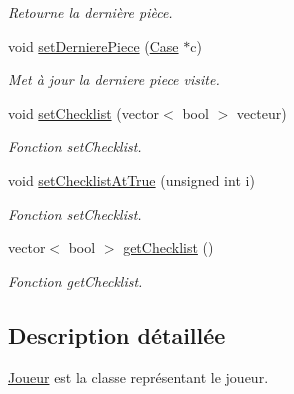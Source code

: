 \begin{DoxyCompactItemize}
\begin{DoxyCompactList}\small\item\em \-Retourne la dernière pièce. \end{DoxyCompactList}\item 
\hypertarget{classJoueur_ace4248a785b7be8e12bcaaf84e3a41b5}{void \hyperlink{classJoueur_ace4248a785b7be8e12bcaaf84e3a41b5}{set\-Derniere\-Piece} (\hyperlink{classCase}{\-Case} $\ast$c)}\label{classJoueur_ace4248a785b7be8e12bcaaf84e3a41b5}

\begin{DoxyCompactList}\small\item\em \-Met à jour la derniere piece visite. \end{DoxyCompactList}\item 
\hypertarget{classJoueur_a5d32e5ba9665404f3b30fa5f548aaf43}{void \hyperlink{classJoueur_a5d32e5ba9665404f3b30fa5f548aaf43}{set\-Checklist} (vector$<$ bool $>$ vecteur)}\label{classJoueur_a5d32e5ba9665404f3b30fa5f548aaf43}

\begin{DoxyCompactList}\small\item\em \-Fonction set\-Checklist. \end{DoxyCompactList}\item 
\hypertarget{classJoueur_a8a94eef8959d5d7f7495429ceaf68124}{void \hyperlink{classJoueur_a8a94eef8959d5d7f7495429ceaf68124}{set\-Checklist\-At\-True} (unsigned int i)}\label{classJoueur_a8a94eef8959d5d7f7495429ceaf68124}

\begin{DoxyCompactList}\small\item\em \-Fonction set\-Checklist. \end{DoxyCompactList}\item 
\hypertarget{classJoueur_aef8ade4a19666cee6596b35b0b30017a}{vector$<$ bool $>$ \hyperlink{classJoueur_aef8ade4a19666cee6596b35b0b30017a}{get\-Checklist} ()}\label{classJoueur_aef8ade4a19666cee6596b35b0b30017a}

\begin{DoxyCompactList}\small\item\em \-Fonction get\-Checklist. \end{DoxyCompactList}\end{DoxyCompactItemize}


\subsection{\-Description détaillée}
\hyperlink{classJoueur}{\-Joueur} est la classe représentant le joueur. 

